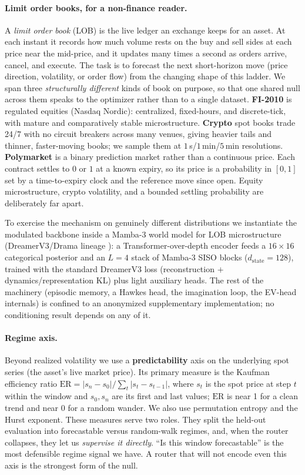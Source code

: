 \documentclass{article}
\begin{document}
\paragraph{Limit order books, for a non-finance reader.}
A \emph{limit order book} (LOB) is the live ledger an exchange keeps for an asset.
At each instant it records how much volume rests on the buy and sell sides at each
price near the mid-price, and it updates many times a second as orders arrive,
cancel, and execute. The task is to forecast the next short-horizon move (price
direction, volatility, or order flow) from the changing shape of this ladder. We
span three \emph{structurally different} kinds of book on purpose, so that one
shared null across them speaks to the optimizer rather than to a single dataset.
\textbf{FI-2010} is regulated equities (Nasdaq Nordic): centralized, fixed-hours,
and discrete-tick, with mature and comparatively stable microstructure.
\textbf{Crypto} spot books trade 24/7 with no circuit breakers across many venues,
giving heavier tails and thinner, faster-moving books; we sample them at
$1\,$s/$1\,$min/$5\,$min resolutions. \textbf{Polymarket} is a binary prediction
market rather than a continuous price. Each contract settles to $0$ or $1$ at a
known expiry, so its price is a probability in $[0,1]$ set by a time-to-expiry
clock and the reference move since open. Equity microstructure, crypto volatility,
and a bounded settling probability are deliberately far apart.

To exercise the mechanism on genuinely different distributions we instantiate the
modulated backbone inside a Mamba-3 world model for LOB microstructure
(DreamerV3/Drama lineage \citep{hafner2023dreamerv3, wang2024drama}): a
Transformer-over-depth encoder feeds a $16\times16$ categorical posterior and an
$L{=}4$ stack of Mamba-3 SISO blocks ($d_{\text{state}}{=}128$), trained with the
standard DreamerV3 loss (reconstruction $+$ dynamics/representation KL) plus light
auxiliary heads. The rest of the machinery (episodic memory, a Hawkes head, the
imagination loop, the EV-head internals) is confined to an anonymized supplementary
implementation; no conditioning result depends on any of it.

\paragraph{Regime axis.}
Beyond realized volatility we use a \textbf{predictability} axis on the underlying
spot series (the asset's live market price). Its primary measure is the Kaufman
efficiency ratio
$\mathrm{ER}=|s_n-s_0|/\sum_t|s_t-s_{t-1}|$, where $s_t$ is the spot price at step
$t$ within the window and $s_0,s_n$ are its first and last values; $\mathrm{ER}$ is
near 1 for a clean trend and near 0 for a random wander. We also use permutation
entropy and the Hurst exponent. These measures serve two roles. They split the
held-out evaluation into forecastable versus random-walk regimes, and, when the
router collapses, they let us \emph{supervise it directly}. ``Is this window
forecastable'' is the most defensible regime signal we have. A router that will not
encode even this axis is the strongest form of the null.
\end{document}
